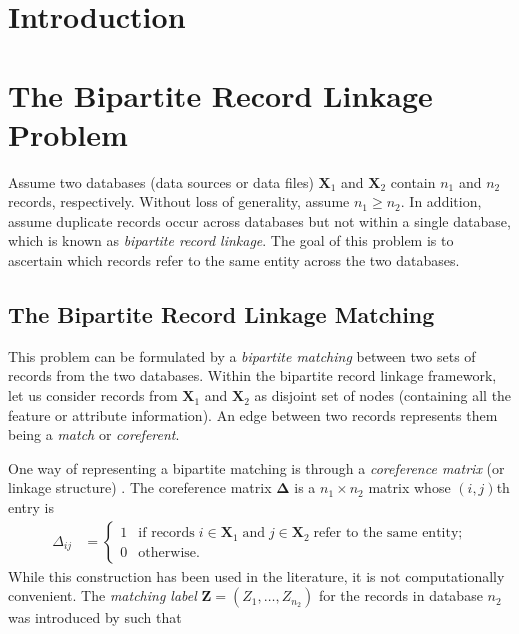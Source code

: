 \documentclass[ba]{imsart}
\newcommand{\bZ}{\boldsymbol{Z}}
\newcommand{\bX}{\boldsymbol{X}}
\newcommand{\bDelta}{\boldsymbol{\Delta}}
\begin{document}
\section{Introduction}
\label{sec:intro}


\section{The Bipartite Record Linkage Problem}
\label{sec:problem}
Assume two databases (data sources or data files) $\bX_1$ and $\bX_2$ contain $n_1$ and $n_2$ records, respectively. Without loss of generality, assume $n_1 \geq n_2.$ In addition, assume duplicate records occur across databases but not within a single database, which is known as \textit{bipartite record linkage}. The goal of this problem is to ascertain which records refer to the same entity across the two databases.

\subsection{The Bipartite Record Linkage Matching}
\label{sec:bipartite}


This problem can be formulated by a \textit{bipartite matching} between two sets of records from the two databases. Within the bipartite record linkage framework, let us consider records from $\bX_1$ and $\bX_2$ as disjoint set of nodes (containing all the feature or attribute information). An edge between two records represents them being a \textit{match} or \textit{coreferent}. 

One way of representing a bipartite matching is through a \textit{coreference matrix} (or linkage structure) \citep{Fortinietal01, Larsen02, Larsen05,  liseo_2011, sadinle_detecting_2014, steorts_bayesian_2016}. The coreference matrix $\bDelta$ is a $n_1 \times n_2$ matrix whose $(i,j)$th entry is
\begin{align}
\Delta_{ij} &=
\begin{cases}
1  & \text{if records} \; i \in \bX_1 \; \text{and}\; j \in \bX_2 \; \text{refer to the same entity;} \\
0 &  \text{otherwise.}
\end{cases}
\end{align}
While this construction has been used in the literature, it is not computationally convenient. The \textit{matching label} 
$\bZ = (Z_1, \ldots, Z_{n_2})$ for the records in database $n_2$ was introduced by \cite{sadinle_bayesian_2017} such that 
\end{document}

